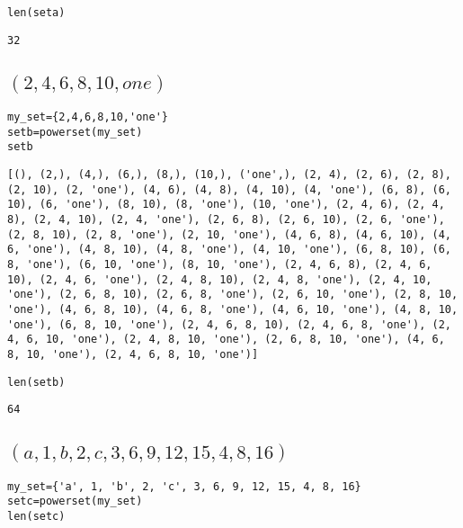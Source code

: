\documentclass[11pt]{article}
\begin{document}
\begin{verbatim}
len(seta)
\end{verbatim}

\begin{verbatim}
32
\end{verbatim}

\subsection{\((2,4,6,8,10,one)\)}
\label{sec:org85ab075}
\begin{verbatim}
my_set={2,4,6,8,10,'one'}
setb=powerset(my_set)
setb
\end{verbatim}

\begin{verbatim}
[(), (2,), (4,), (6,), (8,), (10,), ('one',), (2, 4), (2, 6), (2, 8), (2, 10), (2, 'one'), (4, 6), (4, 8), (4, 10), (4, 'one'), (6, 8), (6, 10), (6, 'one'), (8, 10), (8, 'one'), (10, 'one'), (2, 4, 6), (2, 4, 8), (2, 4, 10), (2, 4, 'one'), (2, 6, 8), (2, 6, 10), (2, 6, 'one'), (2, 8, 10), (2, 8, 'one'), (2, 10, 'one'), (4, 6, 8), (4, 6, 10), (4, 6, 'one'), (4, 8, 10), (4, 8, 'one'), (4, 10, 'one'), (6, 8, 10), (6, 8, 'one'), (6, 10, 'one'), (8, 10, 'one'), (2, 4, 6, 8), (2, 4, 6, 10), (2, 4, 6, 'one'), (2, 4, 8, 10), (2, 4, 8, 'one'), (2, 4, 10, 'one'), (2, 6, 8, 10), (2, 6, 8, 'one'), (2, 6, 10, 'one'), (2, 8, 10, 'one'), (4, 6, 8, 10), (4, 6, 8, 'one'), (4, 6, 10, 'one'), (4, 8, 10, 'one'), (6, 8, 10, 'one'), (2, 4, 6, 8, 10), (2, 4, 6, 8, 'one'), (2, 4, 6, 10, 'one'), (2, 4, 8, 10, 'one'), (2, 6, 8, 10, 'one'), (4, 6, 8, 10, 'one'), (2, 4, 6, 8, 10, 'one')]
\end{verbatim}

\begin{verbatim}
len(setb)
\end{verbatim}

\begin{verbatim}
64
\end{verbatim}

\subsection{\((a, 1, b, 2, c, 3, 6, 9, 12, 15, 4, 8, 16)\)}
\label{sec:orgf20654c}

\begin{verbatim}
my_set={'a', 1, 'b', 2, 'c', 3, 6, 9, 12, 15, 4, 8, 16}
setc=powerset(my_set)
len(setc)
\end{verbatim}
\end{document}
